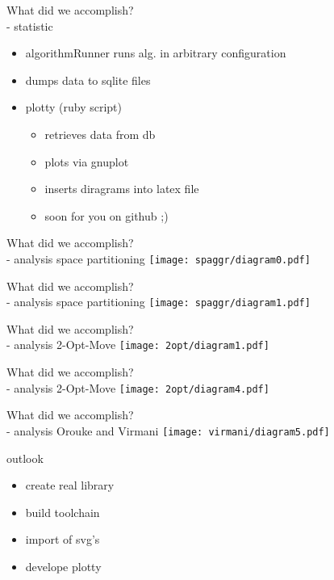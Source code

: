 \documentclass[ucs,9ptb]{beamer}
\begin{document}
\begin{frame}{What did we accomplish?\\- statistic}
  \begin{itemize}
    \item algorithmRunner runs alg. in arbitrary configuration
    \item dumps data to sqlite files
    \item plotty (ruby script)
    \begin{itemize}
      \item retrieves data from db
      \item plots via gnuplot
      \item inserts diragrams into latex file
      \item soon for you on github  ;)
    \end{itemize}
  \end{itemize}
\end{frame}

\begin{frame}{What did we accomplish?\\- analysis}
  space partitioning
  \texttt{[image: spaggr/diagram0.pdf]}
\end{frame}

\begin{frame}{What did we accomplish?\\- analysis}
  space partitioning
  \texttt{[image: spaggr/diagram1.pdf]}
\end{frame}

\begin{frame}{What did we accomplish?\\- analysis}
  2-Opt-Move
  \texttt{[image: 2opt/diagram1.pdf]}
\end{frame}

\begin{frame}{What did we accomplish?\\- analysis}
  2-Opt-Move
  \texttt{[image: 2opt/diagram4.pdf]}
\end{frame}

\begin{frame}{What did we accomplish?\\- analysis}
  Orouke and Virmani
  \texttt{[image: virmani/diagram5.pdf]}
\end{frame}

\begin{frame}{outlook}
  \begin{itemize}
    \item create real library
    \item build toolchain
    \item import of svg's
    \item develope plotty
  \end{itemize}
\end{frame}
\end{document}
